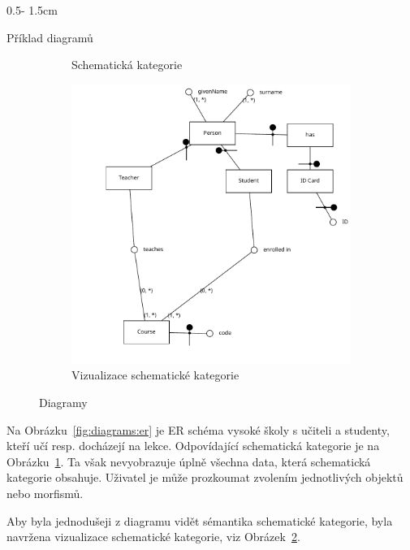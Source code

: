\documentclass[a0paper]{uioposter}
\begin{document}
\begin{frame}
\begin{columns}[onlytextwidth]
\begin{column}{0.5\textwidth - 1.5cm}
\begin{block}{Příklad diagramů}
\begin{figure}
\begin{subfigure}{0.45\textwidth}
            \caption{Schematická kategorie}
            \label{fig:diagrams:schemcat}
          \end{subfigure}
          \begin{subfigure}{0.5\textwidth}
            \includegraphics[width=\textwidth]{./images/university-scv.pdf}
            \caption{Vizualizace schematické kategorie}
            \label{fig:diagrams:scv}
          \end{subfigure}
          \caption{Diagramy}
          \label{fig:diagrams}
        \end{figure}

        Na Obrázku~\ref{fig:diagrams:er} je ER schéma vysoké školy s učiteli a studenty, kteří učí resp. docházejí na lekce.
        Odpovídající schematická kategorie je na Obrázku~\ref{fig:diagrams:schemcat}.
        Ta však nevyobrazuje úplně všechna data, která schematická kategorie obsahuje.
        Uživatel je může prozkoumat zvolením jednotlivých objektů nebo morfismů.

        Aby byla jednodušeji z diagramu vidět sémantika schematické kategorie, byla navržena vizualizace schematické kategorie, viz Obrázek~\ref{fig:diagrams:scv}.
      \end{block}
    \end{column}



\end{columns}
\end{frame}
\end{document}
